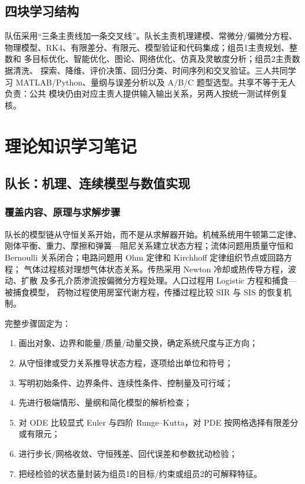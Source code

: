 \documentclass[UTF8,a4paper,12pt]{ctexart}
\begin{document}
\subsection{四块学习结构}

队伍采用“三条主责线加一条交叉线”。队长主责机理建模、常微分/偏微分方程、
物理模型、RK4、有限差分、有限元、模型验证和代码集成；组员1主责规划、整数和
多目标优化、智能优化、图论、网络优化、仿真及灵敏度分析；组员2主责数据清洗、
探索、降维、评价决策、回归分类、时间序列和交叉验证。三人共同学习
MATLAB/Python、量纲与误差分析以及 A/B/C 题型选型。共享不等于无人负责：公共
模块仍由对应主责人提供输入输出关系，另两人按统一测试样例复核。

\section{理论知识学习笔记}

\subsection{队长：机理、连续模型与数值实现}

\subsubsection{覆盖内容、原理与求解步骤}

队长的模型链从守恒关系开始，而不是从求解器开始。机械系统用牛顿第二定律、
刚体平衡、重力、摩擦和弹簧—阻尼关系建立状态方程；流体问题用质量守恒和
Bernoulli 关系闭合；电路问题用 Ohm 定律和 Kirchhoff 定律组织节点或回路方程；
气体过程核对理想气体状态关系。传热采用 Newton 冷却或热传导方程，波动、扩散
及多孔介质渗流按偏微分方程处理。人口过程用 Logistic 方程和捕食—被捕食模型，
药物过程使用房室代谢方程，传播过程比较 SIR 与 SIS 的恢复机制。

完整步骤固定为：
\begin{enumerate}
  \item 画出对象、边界和能量/质量/动量交换，确定系统尺度与正方向；
  \item 从守恒律或受力关系推导状态方程，逐项给出单位和符号；
  \item 写明初始条件、边界条件、连续性条件、控制量及可行域；
  \item 先进行极端情形、量纲和简化模型的解析检查；
  \item 对 ODE 比较显式 Euler 与四阶 Runge--Kutta，对 PDE 按网格选择有限差分或有限元；
  \item 进行步长/网格收敛、守恒残差、回代误差和参数扰动检验；
  \item 把经检验的状态量封装为组员1的目标/约束或组员2的可解释特征。
\end{enumerate}
\end{document}
